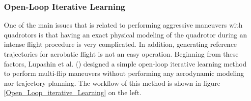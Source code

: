 \documentclass{thesisreport}
\begin{document}
 \subsubsection{Open-Loop Iterative Learning}

One of the main issues that is related to performing aggressive maneuvers with quadrotors is that having an exact physical modeling of the quadrotor during an intense flight procedure is very complicated. In addition, generating reference trajectories for aerobatic flight is not an easy operation. Beginning from these factors, Lupashin et al. (\cite{Lupashin2010,Lupashin2011,Lupashin2012})
designed a simple open-loop iterative learning method to perform multi-flip maneuvers without performing any aerodynamic modeling nor trajectory planning. The workflow of this method is shown in figure \ref{Open_Loop_iterative_Learning} on the left.
\end{document}
